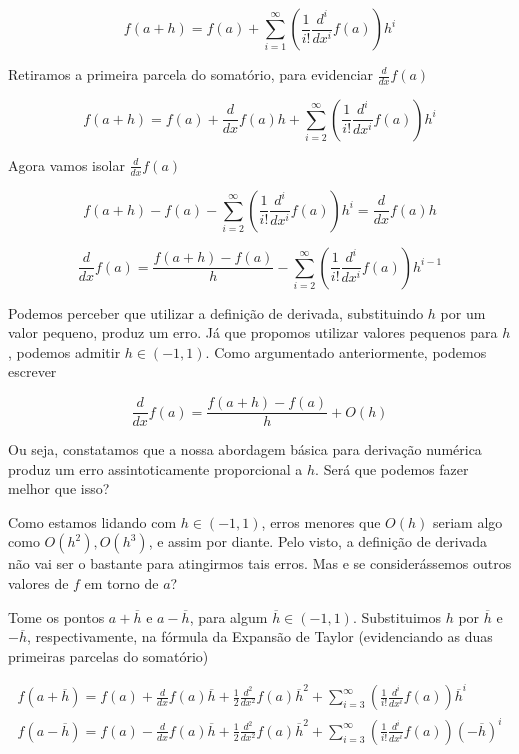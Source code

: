 \documentclass[]{article}
\numberwithin{equation}{section}
\begin{document}
$$
f(a + h) = f(a) + \sum_{i = 1}^{\infty} \left(\frac{1}{i!} \frac{d^i}{dx^i} f(a)\right) h^i
$$

Retiramos a primeira parcela do somatório, para evidenciar $\frac{d}{dx} f(a)$

$$
f(a + h) = f(a) + \frac{d}{dx} f(a)h + \sum_{i = 2}^{\infty} \left(\frac{1}{i!} \frac{d^i}{dx^i} f(a)\right) h^i
$$

Agora vamos isolar $\frac{d}{dx} f(a)$

$$
f(a + h) - f(a) - \sum_{i = 2}^{\infty} \left(\frac{1}{i!} \frac{d^i}{dx^i} f(a)\right) h^i = \frac{d}{dx} f(a)h
$$

$$
\frac{d}{dx} f(a) = \frac{f(a + h) - f(a)}{h} - \sum_{i = 2}^{\infty} \left(\frac{1}{i!} \frac{d^i}{dx^i} f(a)\right) h^{i - 1}
$$

Podemos perceber que utilizar a definição de derivada, substituindo $h$ por um valor pequeno, produz um erro. Já que propomos utilizar valores pequenos para $h$, podemos admitir $h \in (-1, 1)$. Como argumentado anteriormente, podemos escrever

$$
\frac{d}{dx} f(a) = \frac{f(a + h) - f(a)}{h} + O(h)
$$

Ou seja, constatamos que a nossa abordagem básica para derivação numérica produz um erro assintoticamente proporcional a $h$. Será que podemos fazer melhor que isso?

Como estamos lidando com $h \in (-1, 1)$, erros menores que $O(h)$ seriam algo como $O(h^2), O(h^3)$, e assim por diante. Pelo visto, a definição de derivada não vai ser o bastante para atingirmos tais erros. Mas e se considerássemos outros valores de $f$ em torno de $a$?

Tome os pontos $a + \overline{h}$ e $a - \overline{h}$, para algum $\overline{h} \in (-1, 1)$. Substituimos $h$ por $\overline{h}$ e $-\overline{h}$, respectivamente, na fórmula da Expansão de Taylor (evidenciando as duas primeiras parcelas do somatório)

\begin{align}
f(a + \overline{h}) = f(a) + \frac{d}{dx} f(a)\overline{h} + \frac{1}{2} \frac{d^2}{dx^2} f(a) \overline{h}^2 + \sum_{i = 3}^{\infty} \left(\frac{1}{i!} \frac{d^i}{dx^i} f(a)\right) \overline{h}^i \label{taylor_a+h} \\
f(a - \overline{h}) = f(a) - \frac{d}{dx} f(a)\overline{h} + \frac{1}{2} \frac{d^2}{dx^2} f(a) \overline{h}^2 + \sum_{i = 3}^{\infty} \left(\frac{1}{i!} \frac{d^i}{dx^i} f(a)\right) (-\overline{h})^i \label{taylor_a-h}
\end{align}
\end{document}
